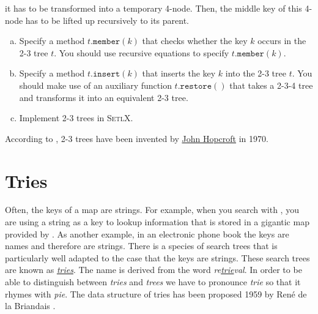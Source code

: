 it has to be transformed into a temporary 4-node.  Then, the middle key of this 4-node has to be
lifted up recursively to its parent.  
\begin{enumerate}[(a)]
\item Specify a method $t.\mathtt{member}(k)$ that checks whether the key $k$ occurs in the 2-3 tree
      $t$.  You should use recursive equations to specify  $t.\mathtt{member}(k)$.
\item Specify a method $t.\mathtt{insert}(k)$ that inserts the key $k$ into the 2-3 tree
      $t$.  You should make use of an auxiliary function $t.\mathtt{restore}()$ that takes a 2-3-4
      tree and transforms it into an equivalent 2-3 tree.
\item Implement 2-3 trees in \textsc{SetlX}.
\end{enumerate}
According to \cite{cormen:09}, 2-3 trees have been invented by
\href{https://en.wikipedia.org/wiki/John_Hopcroft}{John Hopcroft} in 1970.



\section{Tries}
Often, the keys of a map are strings.  For example, when you search with 
, you are using a
string as a key to lookup information that is stored in a gigantic map provided by 
.
As another example, in an electronic phone book the keys are names and therefore are strings.  
There is a species of search trees that is particularly well adapted to the case that the keys are
strings.  These search trees are known as \href{https://en.wikipedia.org/?title=Trie}{\emph{tries}}.  
The name is derived from the word
\emph{re\underline{trie}val}.  In order to be able to distinguish between \emph{tries} and
\emph{trees} we have to pronounce  \emph{trie}  so that it rhymes with \emph{pie}.   The data
structure of tries has been proposed 1959 by Ren\'e de la Briandais \cite{briandais:59}.

